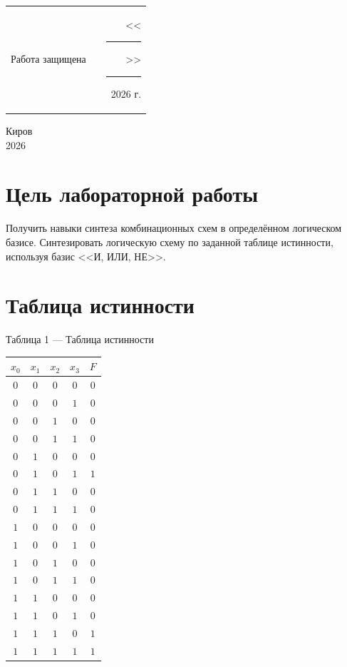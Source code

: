 \documentclass[oneside,a4paper,14pt]{extarticle}
\begin{document}
\noindent
\begin{tabular}{lp{58mm}r}
  Работа защищена &  & \hspace{5mm}<<\rule[-1mm]{5mm}{0.10mm}\/>>\rule[-1mm]{30mm}{0.10mm}\ 2026 г.
\end{tabular}
\vfill

\begin{center}
  Киров\\
  2026
\end{center}

\newpage\thispagestyle{plain}

\section{Цель лабораторной работы}
Получить навыки синтеза комбинационных схем в определённом логическом базисе. Синтезировать логическую схему по заданной таблице истинности, используя базис <<И, ИЛИ, НЕ>>.

\section{Таблица истинности}
\begin{center}
  Таблица 1 --- Таблица истинности \\
  \vspace{5mm}
  \begin{tabular}{cccc|c}
    $x_0$ & $x_1$ & $x_2$ & $x_3$ & $F$ \\
    \hline
    $0$   & $0$   & $0$   & $0$   & $0$ \\
    $0$   & $0$   & $0$   & $1$   & $0$ \\
    $0$   & $0$   & $1$   & $0$   & $0$ \\
    $0$   & $0$   & $1$   & $1$   & $0$ \\
    $0$   & $1$   & $0$   & $0$   & $0$ \\
    $0$   & $1$   & $0$   & $1$   & $1$ \\
    $0$   & $1$   & $1$   & $0$   & $0$ \\
    $0$   & $1$   & $1$   & $1$   & $0$ \\
    $1$   & $0$   & $0$   & $0$   & $0$ \\
    $1$   & $0$   & $0$   & $1$   & $0$ \\
    $1$   & $0$   & $1$   & $0$   & $0$ \\
    $1$   & $0$   & $1$   & $1$   & $0$ \\
    $1$   & $1$   & $0$   & $0$   & $0$ \\
    $1$   & $1$   & $0$   & $1$   & $0$ \\
    $1$   & $1$   & $1$   & $0$   & $1$ \\
    $1$   & $1$   & $1$   & $1$   & $1$ \\
  \end{tabular}
\end{center}
\end{document}
